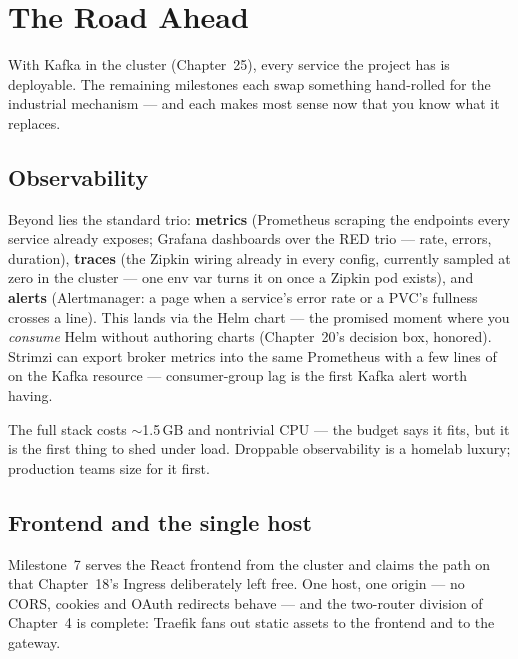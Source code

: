 \chapter{The Road Ahead}
\label{ch:roadahead}

With Kafka in the cluster (Chapter~25), every service the project has is
deployable. The remaining milestones each swap something hand-rolled
for the industrial mechanism --- and each makes most sense now that you
know what it replaces.

\section{Observability}

Beyond  lies the standard trio: \textbf{metrics}
(Prometheus scraping the  endpoints every
service already exposes; Grafana dashboards over the RED trio ---
rate, errors, duration), \textbf{traces} (the Zipkin wiring already in
every config, currently sampled at zero in the cluster --- one env var
turns it on once a Zipkin pod exists), and \textbf{alerts}
(Alertmanager: a page when a service's error rate or a PVC's fullness
crosses a line). This lands via the  Helm
chart --- the promised moment where you \emph{consume} Helm without
authoring charts (Chapter~20's decision box, honored). Strimzi can
export broker metrics into the same Prometheus with a few lines of
 on the Kafka resource --- consumer-group lag is
the first Kafka alert worth having.

\begin{hardware}
The full stack costs $\sim$1.5\,GB and nontrivial CPU --- the budget
says it fits, but it is the first thing to shed under load. Droppable
observability is a homelab luxury; production teams size for it first.
\end{hardware}

\section{Frontend and the single host}

Milestone~7 serves the React frontend from the cluster and claims the
\code{/} path on  that Chapter~18's Ingress deliberately
left free. One host, one origin --- no CORS, cookies and OAuth
redirects behave --- and the two-router division of Chapter~4 is
complete: Traefik fans out static assets to the frontend and
 to the gateway.

